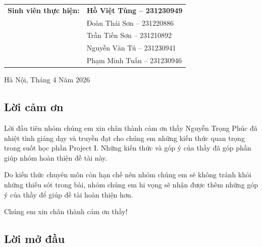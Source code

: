 \documentclass[12pt,a4paper]{article}
\begin{document}
\begin{titlepage}
\begin{minipage}{0.6\textwidth}
\begin{flushleft}
\begin{center}
\begin{tabular}{p{5cm} p{8cm}}
\textbf{Sinh viên thực hiện:}
&
\textbf{Hồ Việt Tùng -- 231230949}
\\[0.2cm]

&
Đoàn Thái Sơn -- 231220886
\\[0.2cm]

&
Trần Tiến Sơn -- 231210892
\\[0.2cm]

&
Nguyễn Văn Tú -- 231230941
\\[0.2cm]

&
Phạm Minh Tuấn -- 231230946
\\
\end{tabular}
\end{center}

\end{flushleft}
\end{minipage}

\vfill

{\centering Hà Nội, Tháng 4 Năm 2026}

\end{titlepage}

\begin{center}
    \section*{Lời cảm ơn}
\end{center}

Lời đầu tiên nhóm chúng em xin chân thành cảm ơn thầy Nguyễn Trọng Phúc đã nhiệt tình giảng dạy và truyền đạt cho chúng em những kiến thức quan trọng trong suốt học phần Project I. Những kiến thức và góp ý của thầy đã góp phần giúp nhóm hoàn thiện đề tài này. 

Do kiến thức chuyên môn còn hạn chế nên nhóm chúng em sẽ không tránh khỏi những thiếu sót trong bài, nhóm chúng em hi vọng sẽ nhận được thêm những góp ý của thầy để giúp đề tài hoàn thiện hơn. 

Chúng em xin chân thành cảm ơn thầy! 

\clearpage

\tableofcontents

\clearpage

\listoffigures

\clearpage

\listoftables

\clearpage

\begin{center}
\section*{Lời mở đầu}
\end{center}
\end{document}

